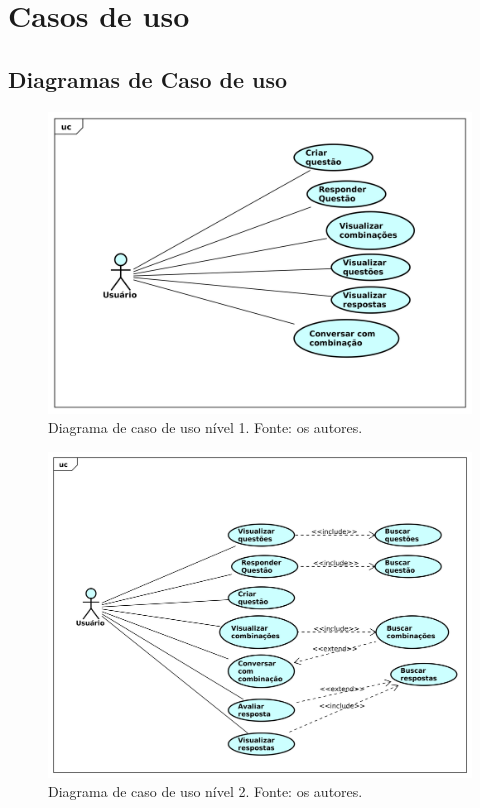 \chapter{Casos de uso}


\section{Diagramas de Caso de uso}

\begin{figure}[!htb]
\centering
\includegraphics[width=16cm]{DCU1.png}
\caption{Diagrama de caso de uso nível 1. Fonte: os autores.}
\label{fig:DCU1}
\end{figure}

\begin{figure}[!htb]
\centering
\includegraphics[width=16cm]{DCU2.png}
\caption{Diagrama de caso de uso nível 2. Fonte: os autores.}
\label{fig:DCU2}
\end{figure}

